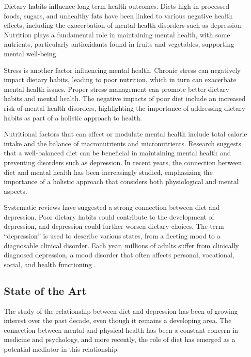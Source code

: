 \documentclass[jou]{apa7}
\begin{document}
	Dietary habits influence long-term health outcomes. Diets high in processed foods, sugars, and unhealthy fats have been linked to various negative health effects, including the exacerbation of mental health disorders such as depression. Nutrition plays a fundamental role in maintaining mental health, with some nutrients, particularly antioxidants found in fruits and vegetables, supporting mental well-being.

	Stress is another factor influencing mental health. Chronic stress can negatively impact dietary habits, leading to poor nutrition, which in turn can exacerbate mental health issues. Proper stress management can promote better dietary habits and mental health. The negative impacts of poor diet include an increased risk of mental health disorders, highlighting the importance of addressing dietary habits as part of a holistic approach to health.

	Nutritional factors that can affect or modulate mental health include total calorie intake and the balance of macronutrients and micronutrients. Research suggests that a well-balanced diet can be beneficial in maintaining mental health and preventing disorders such as depression. In recent years, the connection between diet and mental health has been increasingly studied, emphasizing the importance of a holistic approach that considers both physiological and mental aspects.

	Systematic reviews have suggested a strong connection between diet and depression. Poor dietary habits could contribute to the development of depression, and depression could further worsen dietary choices. The term ``depression'' is used to describe various states, from a fleeting mood to a diagnosable clinical disorder. Each year, millions of adults suffer from clinically diagnosed depression, a mood disorder that often affects personal, vocational, social, and health functioning \parencite{APA2014}.



\subsection{State of the Art}

The study of the relationship between diet and depression has been of growing interest over the past decade, even though it remains a developing area. The connection between mental and physical health has been a constant concern in medicine and psychology, and more recently, the role of diet has emerged as a potential mediator in this relationship.
\end{document}
